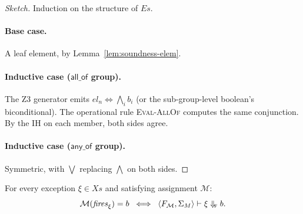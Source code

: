 \begin{proof}[Sketch]
Induction on the structure of $\mathit{Es}$.

\paragraph{Base case.} A leaf element, by
Lemma~\ref{lem:soundness-elem}.

\paragraph{Inductive case ($\textsf{all\_of}$ group).} The Z3
generator emits $\mathit{el}_n \Leftrightarrow \bigwedge_i b_i$
(or the sub-group-level boolean's biconditional). The operational
rule \textsc{Eval-AllOf} computes the same conjunction. By the IH
on each member, both sides agree.

\paragraph{Inductive case ($\textsf{any\_of}$ group).} Symmetric,
with $\bigvee$ replacing $\bigwedge$ on both sides.
\end{proof}

\begin{lemma}
\label{lem:soundness-exc}
For every exception $\xi \in \mathit{Xs}$ and satisfying
assignment $\mathcal{M}$:
\[
  \mathcal{M}(\mathit{fires}_\xi) = b
  \;\;\Longleftrightarrow\;\;
  \langle F_\mathcal{M}, \Sigma_M \rangle \vdash \xi
  \Downarrow_{\!\textsc{f}} b.
\]
\end{lemma}


